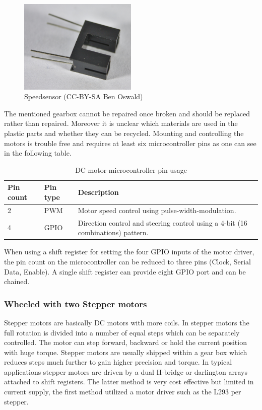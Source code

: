\documentclass[11pt,a4paper]{article}
\begin{document}
\begin{figure}[H]
  \centering
  \includegraphics[width=0.5\textwidth]{images/30_speedsensor.jpg}
  \caption{Speedsensor (CC-BY-SA Ben Oswald)}
\end{figure}

The mentioned gearbox cannot be repaired once broken and should be replaced rather than repaired. Moreover it is unclear which materials are used in the plastic parts and whether they can be recycled. Mounting and controlling the motors is trouble free and requires at least six microcontroller pins as one can see in the following table.

\begin{table}[H]
\centering
\begin{tabular}{p{}p{}p{}}
\toprule
Pin count & Pin type & Description \\
\midrule
2 & PWM  & Motor speed control using pulse-width-modulation.\\
4 & GPIO & Direction control and steering control using a 4-bit (16 combinations) pattern.\\
\bottomrule
\end{tabular}
\caption{DC motor microcontroller pin usage}
\label{tbl:dc_pin}
\end{table}

When using a shift register for setting the four GPIO inputs of the motor driver, the pin count on the microcontroller can be reduced to three pins (Clock, Serial Data, Enable).  A single shift register can provide eight GPIO port and can be chained. 


\subsubsection{Wheeled with two Stepper motors}
Stepper motors are basically DC motors with more coils. In stepper motors the full rotation is divided into a number of equal steps which can be separately controlled. The motor can step forward, backward or hold the current position with huge torque. Stepper motors are usually shipped within a gear box which reduces steps much further to gain higher precision and torque. 
In typical applications stepper motors are driven by a dual H-bridge or darlington arrays attached to shift registers. The latter method is very cost effective but limited in current supply, the first method utilized a motor driver such as the L293 per stepper.
\end{document}
